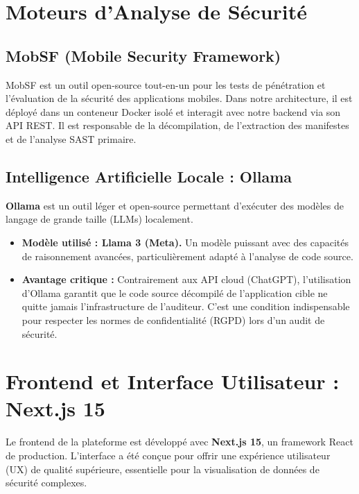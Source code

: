\section{Moteurs d'Analyse de Sécurité}

\subsection{MobSF (Mobile Security Framework)}
MobSF est un outil open-source tout-en-un pour les tests de pénétration et l'évaluation de la sécurité des applications mobiles. Dans notre architecture, il est déployé dans un conteneur Docker isolé et interagit avec notre backend via son API REST. Il est responsable de la décompilation, de l'extraction des manifestes et de l'analyse SAST primaire.

\subsection{Intelligence Artificielle Locale : Ollama}
\textbf{Ollama} est un outil léger et open-source permettant d'exécuter des modèles de langage de grande taille (LLMs) localement.
\begin{itemize}[label=\textcolor{PrimaryBlue}{\faBrain}]
    \item \textbf{Modèle utilisé : Llama 3 (Meta).} Un modèle puissant avec des capacités de raisonnement avancées, particulièrement adapté à l'analyse de code source.
    \item \textbf{Avantage critique :} Contrairement aux API cloud (ChatGPT), l'utilisation d'Ollama garantit que le code source décompilé de l'application cible ne quitte jamais l'infrastructure de l'auditeur. C'est une condition indispensable pour respecter les normes de confidentialité (RGPD) lors d'un audit de sécurité.
\end{itemize}

\section{Frontend et Interface Utilisateur : Next.js 15}
Le frontend de la plateforme est développé avec \textbf{Next.js 15}, un framework React de production. L'interface a été conçue pour offrir une expérience utilisateur (UX) de qualité supérieure, essentielle pour la visualisation de données de sécurité complexes.

